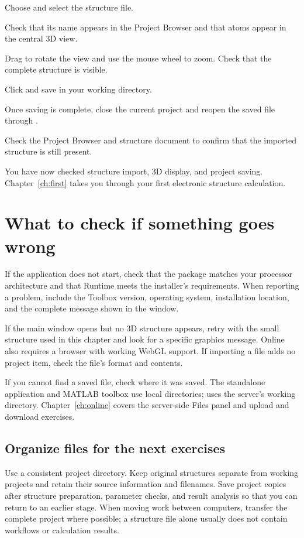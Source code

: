 \begin{steps}
\item Choose  and select the structure file.
\item Check that its name appears in the Project Browser and that atoms appear in the central 3D view.
\item Drag to rotate the view and use the mouse wheel to zoom. Check that the complete structure is visible.
\item Click  and save  in your working directory.
\item Once saving is complete, close the current project and reopen the saved file through .
\item Check the Project Browser and structure document to confirm that the imported structure is still present.
\end{steps}

You have now checked structure import, 3D display, and project saving. Chapter~\ref{ch:first} takes you through your first electronic structure calculation.

\section{What to check if something goes wrong}

If the application does not start, check that the package matches your processor architecture and that Runtime meets the installer's requirements. When reporting a problem, include the Toolbox version, operating system, installation location, and the complete message shown in the window.

If the main window opens but no 3D structure appears, retry with the small structure used in this chapter and look for a specific graphics message. Online also requires a browser with working WebGL support. If importing a file adds no project item, check the file's format and contents.

If you cannot find a saved file, check where it was saved. The standalone application and MATLAB\regmark{} toolbox use local directories; \ksonline{} uses the server's working directory. Chapter~\ref{ch:online} covers the server-side Files panel and upload and download exercises.

\subsection{Organize files for the next exercises}

Use a consistent project directory. Keep original structures separate from working projects and retain their source information and filenames. Save project copies after structure preparation, parameter checks, and result analysis so that you can return to an earlier stage. When moving work between computers, transfer the complete  project where possible; a structure file alone usually does not contain workflows or calculation results.
